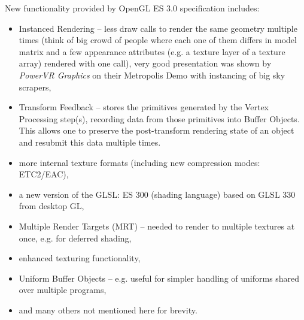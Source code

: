 New functionality provided by OpenGL ES 3.0 specification includes:
\begin{itemize}
\item Instanced Rendering – less draw calls to render the same geometry multiple times (think of big crowd of people where each one of them differs in model matrix and a few appearance attributes (e.g. a texture layer of a texture array) rendered with one call), very good presentation was shown by \emph{PowerVR Graphics} \cite{powervr_graphics} on their Metropolis Demo \cite{powervr_metropolis} with instancing of big sky scrapers,
\item Transform Feedback – stores the primitives generated by the Vertex Processing step(s), recording data from those primitives into Buffer Objects.
This allows one to preserve the post-transform rendering state of an object and resubmit this data multiple times.
\item more internal texture formats (including new compression modes: ETC2/EAC),
\item a new version of the GLSL: ES 300 (shading language) based on GLSL 330 from desktop GL,
\item Multiple Render Targets (MRT) – needed to render to multiple textures at once, e.g. for deferred shading,
\item enhanced texturing functionality,
\item Uniform Buffer Objects – e.g. useful for simpler handling of uniforms shared over multiple programs,
\item and many others not mentioned here for brevity.
\end{itemize}